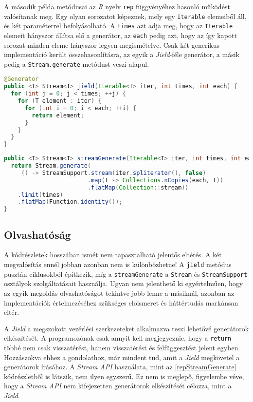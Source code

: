 A második példa metódusai az \textit{R} nyelv \texttt{rep} függvényéhez hasonló működést valósítanak meg. Egy olyan sorozatot képeznek, mely egy \texttt{Iterable} elemeiből áll, és két paraméterrel befolyásolható. A \texttt{times} azt adja meg, hogy az \texttt{Iterable} elemeit hányszor állítsa elő a generátor, az \texttt{each} pedig azt, hogy az így kapott sorozat minden eleme hányszor legyen megismételve. Csak két generikus implementáció került összehasonlításra, az egyik a \textit{Jield}-féle generátor, a másik pedig a \texttt{Stream.generate} metódust veszi alapul.

\begin{lstlisting}[language=Java, caption={Elemek ismétlése \textit{Jield} segítségével}, escapechar=!, captionpos=b, belowskip=1em, belowcaptionskip=0em]
@Generator
public <T> Stream<T> jield(Iterable<T> iter, int times, int each) {
  for (int j = 0; j < times; ++j) {
    for (T element : iter) {
      for (int i = 0; i < each; ++i) {
        return element;
      }
    }
  }
}
\end{lstlisting}

\begin{lstlisting}[language=Java, caption={Elemek ismétlése \texttt{Stream.generate} használatával}, escapechar=!, captionpos=b, aboveskip=1em, label=repStreamGenerate]
public <T> Stream<T> streamGenerate(Iterable<T> iter, int times, int each) {
  return Stream.generate(
     () -> StreamSupport.stream(iter.spliterator(), false)
                        .map(t -> Collections.nCopies(each, t))
                        .flatMap(Collection::stream))
    .limit(times)
    .flatMap(Function.identity());
}
\end{lstlisting} 

\subsection{Olvashatóság}

A kódrészletek hosszában ismét nem tapasztalható jelentős eltérés. A két megvalósítás ennél jobban azonban nem is különbözhetne! A \texttt{jield} metódus pusztán ciklusokból építkezik, míg a \texttt{streamGenerate} a \texttt{Stream} és \texttt{StreamSupport} osztályok szolgáltatásait használja. Ugyan nem jelenthető ki egyértelműen, hogy az egyik megoldás olvashatóságot tekintve jobb lenne a másiknál, azonban az implementációk értelmezéséhez szükséges előismeret és háttértudás markánsan eltér. 

A \textit{Jield} a megszokott vezérlési szerkezeteket alkalmazva teszi lehetővé generátorok elkészítését. A programozónak csak annyit kell megjegyeznie, hogy a \texttt{return} többé nem csak visszatérést, hanem visszatérést és felfüggesztést jelent egyben. Hozzászokva ehhez a gondolathoz, már mindent tud, amit a \textit{Jield} megkövetel a generátorok írásához. A \textit{Stream API} használata, mint az \ref{repStreamGenerate} kódrészletből is látszik, nem ilyen egyszerű. Ez nem is meglepő, figyelembe véve, hogy a \textit{Stream API} nem kifejezetten generátorok elkészítését célozza, mint a \textit{Jield}.

